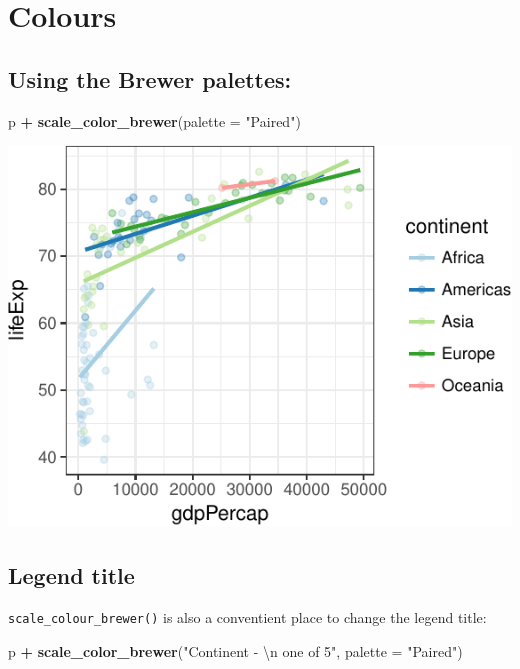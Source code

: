 \documentclass[12pt,]{krantz}
\makeatletter
\newenvironment{Shaded}{\begin{snugshade}}{\end{snugshade}}
\newcommand{\CharTok}[1]{\textcolor[rgb]{0.31,0.60,0.02}{#1}}
\newcommand{\DataTypeTok}[1]{\textcolor[rgb]{0.13,0.29,0.53}{#1}}
\newcommand{\KeywordTok}[1]{\textcolor[rgb]{0.13,0.29,0.53}{\textbf{#1}}}
\newcommand{\NormalTok}[1]{#1}
\newcommand{\OperatorTok}[1]{\textcolor[rgb]{0.81,0.36,0.00}{\textbf{#1}}}
\newcommand{\StringTok}[1]{\textcolor[rgb]{0.31,0.60,0.02}{#1}}
\newenvironment{kframe}{%
\medskip{}
\setlength{\fboxsep}{.8em}
 \def\at@end@of@kframe{}%
 \ifinner\ifhmode%
  \def\at@end@of@kframe{\end{minipage}}%
  \begin{minipage}{\columnwidth}%
 \fi\fi%
 \def\FrameCommand##1{\hskip\@totalleftmargin \hskip-\fboxsep
 \colorbox{shadecolor}{##1}\hskip-\fboxsep
     \hskip-\linewidth \hskip-\@totalleftmargin \hskip\columnwidth}%
 \MakeFramed {\advance\hsize-\width
   \@totalleftmargin\z@ \linewidth\hsize
   \@setminipage}}%
 {\par\unskip\endMakeFramed%
 \at@end@of@kframe}
\renewenvironment{Shaded}{\begin{kframe}}{\end{kframe}}
\theoremstyle{definition}
\theoremstyle{definition}
\theoremstyle{definition}
\theoremstyle{remark}
\makeatother
\begin{document}
\hypertarget{colours}{%
\section{Colours}\label{colours}}

\hypertarget{using-the-brewer-palettes}{%
\subsection{Using the Brewer
palettes:}\label{using-the-brewer-palettes}}

\begin{Shaded}
\begin{Highlighting}[]
\NormalTok{p }\OperatorTok{+}
\StringTok{  }\KeywordTok{scale_color_brewer}\NormalTok{(}\DataTypeTok{palette =} \StringTok{"Paired"}\NormalTok{)}
\end{Highlighting}
\end{Shaded}

\includegraphics{05_fine_tuning_plots_files/figure-latex/unnamed-chunk-10-1.pdf}

\hypertarget{legend-title}{%
\subsection{Legend title}\label{legend-title}}

\texttt{scale\_colour\_brewer()} is also a conventient place to change
the legend title:

\begin{Shaded}
\begin{Highlighting}[]
\NormalTok{p }\OperatorTok{+}
\StringTok{  }\KeywordTok{scale_color_brewer}\NormalTok{(}\StringTok{"Continent - }\CharTok{\textbackslash{}n}\StringTok{ one of 5"}\NormalTok{, }\DataTypeTok{palette =} \StringTok{"Paired"}\NormalTok{)}
\end{Highlighting}
\end{Shaded}
\end{document}
